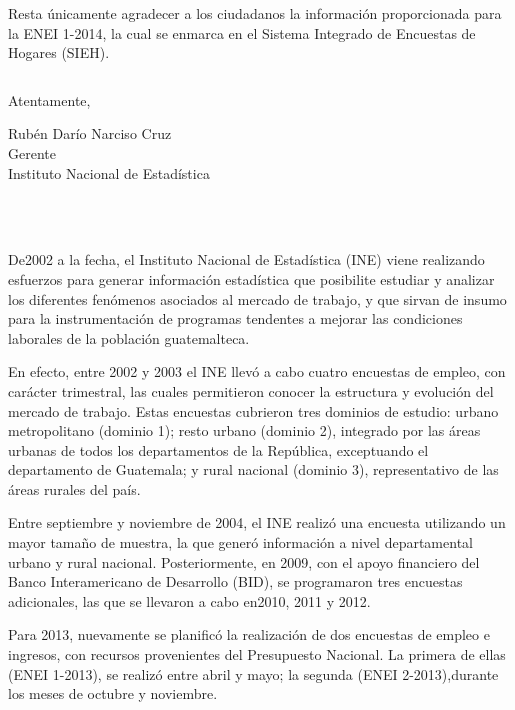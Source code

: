 \documentclass[12pt,letterpaper,twoside]{book}
\let\origdoublepage\cleardoublepage
\newcommand{\clearemptydoublepage}{
  		\clearpage
  		{\pagestyle{empty}\origdoublepage}}
\let\cleardoublepage\clearemptydoublepage
\begin{document}
Resta únicamente agradecer a los ciudadanos la información proporcionada para la ENEI 1-2014, la cual se enmarca en el Sistema Integrado de Encuestas de Hogares (SIEH).

$\ $

\noindent Atentamente,


\begin{center}
Rubén Darío Narciso Cruz\\
Gerente\\
Instituto Nacional de Estadística
\end{center}


\cleardoublepage


$\ $\\[0cm]

\\[7mm]



\\[1mm] \thispagestyle {empty}

De2002 a la fecha, el Instituto Nacional de Estadística (INE) viene realizando esfuerzos para generar información estadística que posibilite estudiar y analizar los diferentes fenómenos asociados al mercado de trabajo, y que sirvan de insumo para la instrumentación de programas tendentes a mejorar las condiciones laborales de la población guatemalteca. 

En efecto, entre 2002 y 2003 el INE llevó a cabo cuatro encuestas de empleo, con carácter trimestral, las cuales permitieron conocer la estructura y evolución del mercado de trabajo. Estas encuestas cubrieron tres dominios de estudio: urbano metropolitano (dominio 1); resto urbano (dominio 2), integrado por las áreas urbanas de todos los departamentos de la República, exceptuando el departamento de Guatemala; y rural nacional (dominio 3), representativo de las áreas rurales del país.

Entre septiembre y noviembre de 2004, el INE realizó una encuesta utilizando un mayor tamaño de muestra, la que generó información a nivel departamental urbano y rural nacional. Posteriormente, en 2009, con el apoyo financiero del Banco Interamericano de Desarrollo (BID), se programaron tres encuestas adicionales, las que se llevaron a cabo en2010, 2011 y 2012.

Para 2013, nuevamente se planificó la realización de dos encuestas de empleo e ingresos, con recursos provenientes del Presupuesto Nacional. La primera de ellas (ENEI 1-2013), se realizó entre abril y mayo; la segunda (ENEI 2-2013),durante los meses de octubre y noviembre.
\end{document}
